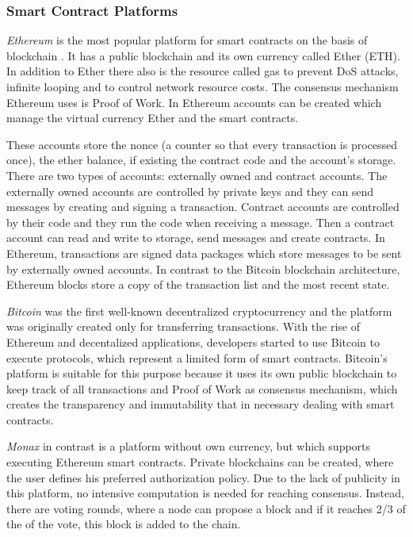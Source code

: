 \documentclass[conference]{IEEEtran}
\begin{document}
\subsubsection{Smart Contract Platforms}
\textit{Ethereum} is the most popular platform for smart contracts on the basis of blockchain \cite{Meitinger2017}. It has a public blockchain and its own currency called Ether (ETH). In addition to Ether there also is the resource called gas to prevent DoS attacks, infinite looping and to control network resource costs. The consensus mechanism Ethereum uses is Proof of Work. In Ethereum accounts can be created which manage the virtual currency Ether and the smart contracts. \cite{Bartoletti2017} \cite{Zhang2016} \par These accounts store the nonce (a counter so that every transaction is processed once), the ether balance, if existing the contract code and the account's storage. There are two types of accounts: externally owned and contract accounts. The externally owned accounts are controlled by private keys and they can send messages by creating and signing a transaction. Contract accounts are controlled by their code and they run the code when receiving a message. Then a contract account can read and write to storage, send messages and create contracts. In Ethereum, transactions are signed data packages which store messages to be sent by externally owned accounts. In contrast to the Bitcoin blockchain architecture, Ethereum blocks store a copy of the transaction list and the most recent state. \cite{Buterin2014}  \par
\textit{Bitcoin} was the first well-known decentralized cryptocurrency and the platform was originally created only for transferring transactions. With the rise of Ethereum and decentalized applications, developers started to use Bitcoin to execute protocols, which represent a limited form of smart contracts. Bitcoin's platform is suitable for this purpose because it uses its own public blockchain to keep track of all transactions and Proof of Work as consensus mechanism, which creates the transparency and immutability that in necessary dealing with smart contracts. \cite{Bartoletti2017} \par 
\textit{Monax} in contrast is a platform without own currency, but which supports executing Ethereum smart contracts. Private blockchains can be created, where the user defines his preferred authorization policy. Due to the lack of publicity in this platform, no intensive computation is needed for reaching consensus. Instead, there are voting rounds, where a node can propose a block and if it reaches 2/3 of the of the vote, this block is added to the chain. \cite{Bartoletti2017} \par 
\end{document}
